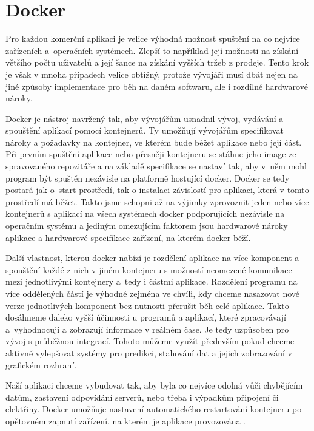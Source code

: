 \section{Docker}

Pro každou komerční aplikaci je velice výhodná možnost spuštění na co nejvíce zařízeních a~operačních systémech. 
Zlepší to například její možnosti na získání většího počtu uživatelů a její šance na získání vyšších tržeb z prodeje. 
Tento krok je však v mnoha případech velice obtížný, protože vývojáři musí dbát nejen na jiné způsoby implementace pro běh na daném softwaru, ale i rozdílné hardwarové nároky. 

Docker je nástroj navržený tak, aby vývojářům usnadnil vývoj, vydávání a spouštění aplikací pomocí kontejnerů.
Ty umožňují vývojářům specifikovat nároky a požadavky na kontejner, ve kterém bude běžet aplikace nebo její část. 
Při prvním spuštění aplikace nebo přesněji kontejneru se stáhne jeho image ze spravovaného repozitáře a na základě specifikace se nastaví tak, aby v~něm mohl program být spuštěn nezávisle na platformě hostující docker. 
Docker se tedy postará jak o~start prostředí, tak o instalaci závislostí pro aplikaci, která v tomto prostředí má běžet. 
Takto jsme schopni až na výjimky zprovoznit jeden nebo více kontejnerů s aplikací na všech systémech docker podporujících nezávisle na operačním systému a jediným omezujícím faktorem jsou hardwarové nároky aplikace a hardwarové specifikace zařízení, na kterém docker běží. 

Další vlastnost, kterou docker nabízí je rozdělení aplikace na více komponent a spouštění každé z nich v jiném kontejneru s možností neomezené komunikace mezi jednotlivými kontejnery a~tedy i částmi aplikace. 
Rozdělení programu na více oddělených částí je výhodné zejména ve chvíli, kdy chceme nasazovat nové verze jednotlivých komponent bez nutnosti přerušit běh celé aplikace.
Takto dosáhneme daleko vyšší účinnosti u programů a aplikací, které zpracovávají a~vyhodnocují a zobrazují informace v reálném čase. 
Je tedy uzpůsoben pro vývoj s průběžnou integrací. 
Tohoto můžeme využít především pokud chceme aktivně vylepšovat systémy pro predikci, stahování dat a jejich zobrazování v grafickém rozhraní.

Naší aplikaci chceme vybudovat tak, aby byla co nejvíce odolná vůči chybějícím datům, zastavení odpovídání serverů, nebo třeba i výpadkům připojení či elektřiny. 
Docker umožňuje nastavení automatického restartování kontejneru po opětovném zapnutí zařízení, na kterém je aplikace provozována \cite{docker:1, docker:2}.

